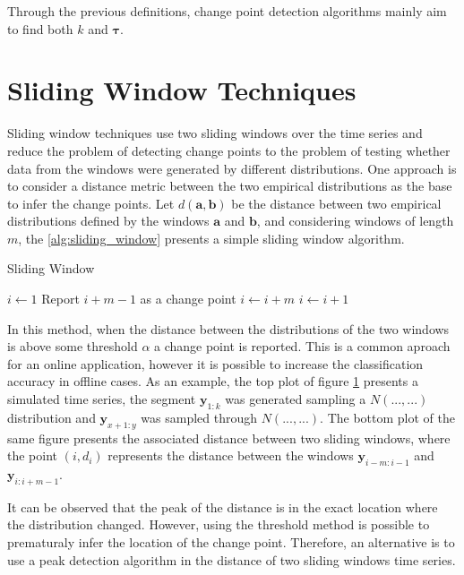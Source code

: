 Through the previous definitions, change point detection algorithms mainly aim to find both $k$ and $\boldsymbol \tau$.

\section{Sliding Window Techniques}

Sliding window techniques use two sliding windows over the time series and reduce the problem of detecting change points to the problem of testing whether data from the windows were generated by different distributions. One approach is to consider a distance metric between the two empirical distributions as the base to infer the change points. Let $d(\mathbf{a}, \mathbf{b})$ be the distance between two empirical distributions defined by the windows $\mathbf{a}$ and $\mathbf{b}$, and considering windows of length $m$, the \ref{alg:sliding_window} presents a simple sliding window algorithm.

\begin{algorithm}[H]
    \label{alg:sliding_window}
    \caption{Sliding Window}
	\begin{algorithmic}[1]
		\State $i \gets 1$
                \State Report $i + m - 1$ as a change point
		        \State $i \gets i + m$
             \Else
		        \State $i \gets i + 1$
             \EndIf
        \EndWhile
	\end{algorithmic}
\end{algorithm}

In this method, when the distance between the distributions of the two windows is above some threshold $\alpha$ a change point is reported. This is a common aproach for an online application, however it is possible to increase the classification accuracy in offline cases. As an example, the top plot of figure \ref{} presents a simulated time series, the segment $\mathbf{y}_{1 : k}$ was generated sampling a $N(..., ...)$ distribution and $\mathbf{y}_{x + 1 : y}$ was sampled through $N(..., ...)$. The bottom plot of the same figure presents the associated distance between two sliding windows, where the point $(i, d_{i})$ represents the distance between the windows $\mathbf{y}_{i - m : i - 1}$ and $\mathbf{y}_{i : i + m - 1}$.

It can be observed that the peak of the distance is in the exact location where the distribution changed. However, using the threshold method is possible to prematuraly infer the location of the change point. Therefore, an alternative is to use a peak detection algorithm in the distance of two sliding windows time series.

